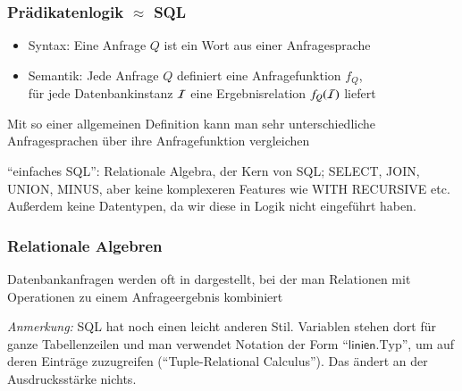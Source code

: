 \documentclass[aspectratio=1610,onlymath]{beamer}
\begin{document}
\begin{frame}\frametitle{Prädikatenlogik $\approx$ SQL}

\begin{itemize}
\item Syntax: Eine Anfrage $Q$ ist ein Wort aus einer Anfragesprache
\item Semantik: Jede Anfrage $Q$ definiert eine Anfragefunktion $f_Q$, \\ für jede Datenbankinstanz $\mathcal{I}$ eine Ergebnisrelation $f_Q(\mathcal{I})$ liefert
\end{itemize}\pause

\pause

Mit so einer allgemeinen Definition kann man sehr unterschiedliche Anfragesprachen über ihre Anfragefunktion vergleichen
\smallskip


\tiny "`einfaches SQL"': Relationale Algebra, der Kern von SQL; SELECT, JOIN, UNION, MINUS, aber keine komplexeren Features wie WITH RECURSIVE etc. Außerdem keine Datentypen, da wir diese in Logik nicht eingeführt haben.

\end{frame}

\begin{frame}\frametitle{Relationale Algebren}

Datenbankanfragen werden oft in  dargestellt,
bei der man Relationen mit Operationen zu einem Anfrageergebnis kombiniert
\bigskip

\medskip

\emph{Anmerkung:} SQL hat noch einen leicht anderen Stil. Variablen stehen dort für ganze Tabellenzeilen und man verwendet Notation der Form "`$\textsf{linien}.\text{Typ}$"', um auf deren Einträge zuzugreifen ("`Tuple-Relational Calculus"'). Das ändert an der Ausdrucksstärke nichts.

\end{frame}
\end{document}
